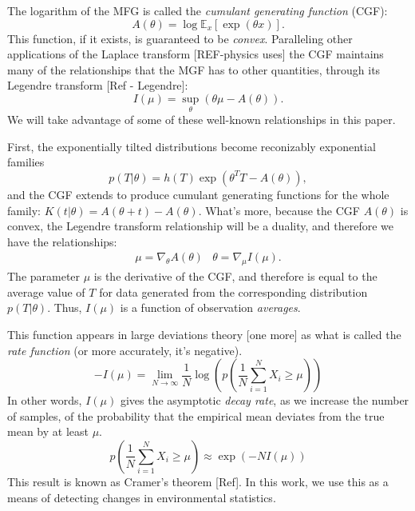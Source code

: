 \documentclass[10pt, twocolumn]{article}      %
\begin{document}
The logarithm of the MFG is called the \textit{cumulant generating function} (CGF):
\begin{equation}
  A(\theta) = \log \mathbb{E}_x[\exp(\theta x)].
\end{equation}
This function, if it exists, is guaranteed to be \textit{convex}.
Paralleling other applications of the Laplace transform [REF-physics uses] the CGF maintains many of the relationships that the MGF has to other quantities, through its Legendre transform [Ref - Legendre]:
\begin{equation}
  I(\mu) = \sup_{\theta}( \theta \mu - A(\theta) ).
\end{equation}
We will take advantage of some of these well-known relationships in this paper.

First, the exponentially tilted distributions become reconizably exponential families
\begin{equation}
  p(T | \theta) = h(T) \exp( \theta^T T - A(\theta) ),
\end{equation}
and the CGF extends to produce cumulant generating functions for the whole family: $K(t | \theta) = A(\theta + t) - A(\theta)$.
What's more, because the CGF $A(\theta)$ is convex, the Legendre transform relationship will be a duality, and therefore we have the relationships:
\begin{eqnarray}
  \mu = \nabla_\theta A(\theta) & \theta = \nabla_\mu I(\mu).
\end{eqnarray}
The parameter $\mu$ is the derivative of the CGF, and therefore is equal to the average value of $T$ for data generated from the corresponding distribution $p(T|\theta)$.
Thus, $I(\mu)$ is a function of observation \textit{averages}.

This function appears in large deviations theory \cite{touchette_basic_2012} [one more] as what is called the \textit{rate function} (or more accurately, it's negative).
\begin{equation}
  -I(\mu) = \lim_{N \to \infty} \frac{1}{N} \log \left( p \left(\frac{1}{N} \sum_{i=1}^N X_i \ge \mu \right) \right)
\end{equation}
In other words, $I(\mu)$ gives the asymptotic \textit{decay rate}, as we increase the number of samples, of the probability that the empirical mean deviates from the true mean by at least $\mu$.
\begin{equation}
  p \left( \frac{1}{N} \sum_{i=1}^N X_i \ge \mu \right) \approx \exp(-N I(\mu))
\end{equation}
This result is known as Cramer's theorem [Ref].
In this work, we use this as a means of detecting changes in environmental statistics. 
\end{document}
